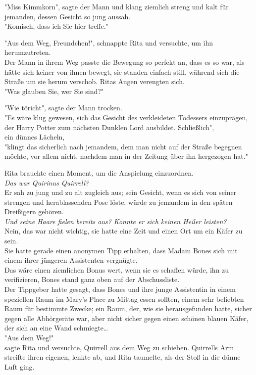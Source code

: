 {"Miss Kimmkorn", sagte der Mann und klang ziemlich streng und kalt für jemanden, dessen Gesicht so jung aussah.\\ "Komisch, dass ich Sie hier treffe."

"Aus dem Weg, Freundchen!", schnappte Rita und versuchte, um ihn herumzutreten.\\ Der Mann in ihrem Weg passte die Bewegung so perfekt an, dass es so war, als hätte sich keiner von ihnen bewegt, sie standen einfach still, während sich die Straße um sie herum verschob. Ritas Augen verengten sich.\\ "Was glauben Sie, wer Sie sind?"

"Wie töricht", sagte der Mann trocken.\\ "Es wäre klug gewesen, sich das Gesicht des verkleideten Todessers einzuprägen, der Harry Potter zum nächsten Dunklen Lord ausbildet. Schließlich",\\ ein dünnes Lächeln,\\ "klingt das sicherlich nach jemandem, dem man nicht auf der Straße begegnen möchte, vor allem nicht, nachdem man in der Zeitung über ihn hergezogen hat."

Rita brauchte einen Moment, um die Anspielung einzuordnen.\\ \emph{Das war Quirinus Quirrell?}\\ Er sah zu jung und zu alt zugleich aus; sein Gesicht, wenn es sich von seiner strengen und herablassenden Pose löste, würde zu jemandem in den späten Dreißigern gehören.\\ \emph{Und seine Haare fielen bereits aus? Konnte er sich keinen Heiler leisten?}\\ Nein, das war nicht wichtig, sie hatte eine Zeit und einen Ort um ein Käfer zu sein.\\ Sie hatte gerade einen anonymen Tipp erhalten, dass Madam Bones sich mit einem ihrer jüngeren Assistenten vergnügte.\\ Das wäre einen ziemlichen Bonus wert, wenn sie es schaffen würde, ihn zu verifizieren, Bones stand ganz oben auf der Abschussliste.\\ Der Tippgeber hatte gesagt, dass Bones und ihre junge Assistentin in einem speziellen Raum im Mary's Place zu Mittag essen sollten, einem sehr beliebten Raum für bestimmte Zwecke; ein Raum, der, wie sie herausgefunden hatte, sicher gegen alle Abhörgeräte war, aber nicht sicher gegen einen schönen blauen Käfer, der sich an eine Wand schmiegte…\\ "Aus dem Weg!"\\ sagte Rita und versuchte, Quirrell aus dem Weg zu schieben. Quirrells Arm streifte ihren eigenen, lenkte ab, und Rita taumelte, als der Stoß in die dünne Luft ging.

}
